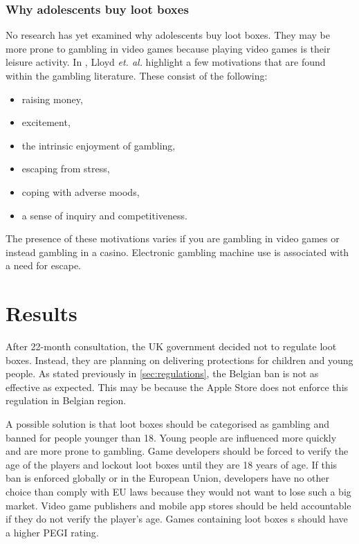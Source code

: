 \documentclass[10pt,oneside,english,a4paper]{article}
\begin{document}
\subsubsection{Why adolescents buy loot boxes} \label{sec:why}

	 No research has yet examined why adolescents buy loot boxes. They may be more prone to gambling in video games because playing video games is their leisure activity. In \cite{report:why}, Lloyd \emph{et. al.} highlight a few motivations that are found within the gambling literature. These consist of the following:

\begin{itemize}

\item raising money,
\item excitement,
\item the intrinsic enjoyment of gambling,
\item escaping from stress,
\item coping with adverse moods,
\item a sense of inquiry and competitiveness.

\end{itemize}
	
The presence of these motivations varies if you are gambling in video games or instead gambling in a casino. Electronic gambling machine use is associated with a need for escape\cite{electronicgambling}. 


\section{Results} \label{sec:results}

	After 22-month consultation, the UK government decided not to regulate loot boxes. Instead, they are planning on delivering protections for children and young people. As stated previously in \ref{sec:regulations}, the Belgian ban is not as effective as expected. This may be because the Apple Store does not enforce this regulation in Belgian region.\par
	A possible solution is that loot boxes should be categorised as gambling and banned for people younger than 18. Young people are influenced more quickly and are more prone to gambling. Game developers should be forced to verify the age of the players and lockout loot boxes until they are 18 years of age. If this ban is enforced globally or in the European Union, developers have no other choice than comply with EU laws because they would not want to lose such a big market. Video game publishers and mobile app stores should be held accountable if they do not verify the player's age. Games containing loot boxes s should have a higher PEGI rating\cite{pegi}.\par
	
\end{document}
